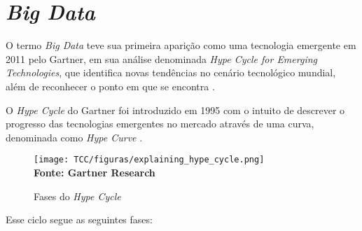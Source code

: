 \section{\textit{Big Data}} O termo \textit{Big Data} teve sua primeira aparição como uma tecnologia emergente em 2011 pelo Gartner, em sua análise denominada \textit{Hype Cycle for Emerging Technologies}, que identifica novas tendências no cenário tecnológico mundial, além de reconhecer o ponto em que se encontra \cite{bigdataincontext}.

O \textit{Hype Cycle} do Gartner foi introduzido em 1995 com o intuito de descrever o progresso das tecnologias emergentes no mercado através de uma curva, denominada como \textit{Hype Curve} \cite{understandinghypecicles}.

\begin{figure}[!ht]
	\centering	
	\caption[\hspace{0.1cm}Fases do \textit{Hype Cycle}]{Fases do \textit{Hype Cycle}}
	  \vspace{-0.4cm}
	\texttt{[image: TCC/figuras/explaining\_hype\_cycle.png]}
	 \vspace{-0.3cm}
	\\\textbf{\footnotesize Fonte: Gartner Research}
	\label{fig:tela1}
\end{figure}

Esse ciclo segue as seguintes fases:

